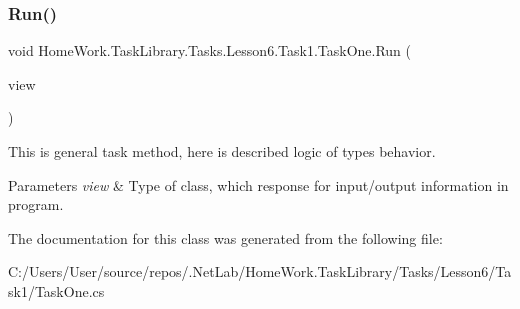\subsubsection{\texorpdfstring{Run()}{Run()}}
{\footnotesize\ttfamily void Home\+Work.\+Task\+Library.\+Tasks.\+Lesson6.\+Task1.\+Task\+One.\+Run (\begin{DoxyParamCaption}\item[{I\+Information}]{view }\end{DoxyParamCaption})}



This is general task method, here is described logic of types behavior. 


\begin{DoxyParams}{Parameters}
{\em view} & Type of class, which response for input/output information in program.\\
\hline
\end{DoxyParams}


The documentation for this class was generated from the following file\+:\begin{DoxyCompactItemize}
\item 
C\+:/\+Users/\+User/source/repos/.\+Net\+Lab/\+Home\+Work.\+Task\+Library/\+Tasks/\+Lesson6/\+Task1/Task\+One.\+cs\end{DoxyCompactItemize}
